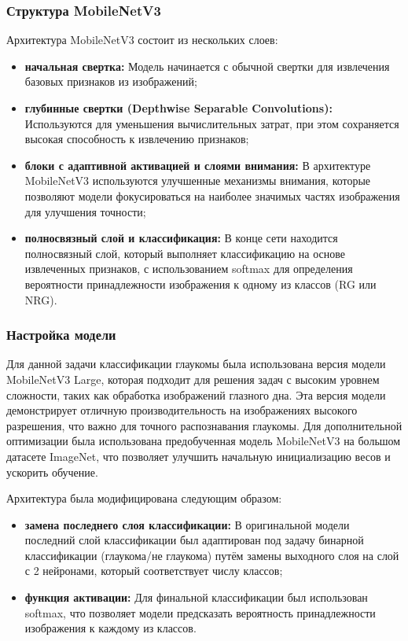 {    \subsubsection*{Структура MobileNetV3}

    Архитектура MobileNetV3 состоит из нескольких слоев:

    \begin{itemize}
        \item \textbf{начальная свертка:} Модель начинается с обычной свертки для извлечения базовых признаков из изображений;
        \item \textbf{глубинные свертки (Depthwise Separable Convolutions):} Используются для уменьшения вычислительных затрат, при этом сохраняется высокая способность к извлечению признаков;
        \item \textbf{блоки с адаптивной активацией и слоями внимания:} В архитектуре MobileNetV3 используются улучшенные механизмы внимания, которые позволяют модели фокусироваться на наиболее значимых частях изображения для улучшения точности;
        \item \textbf{полносвязный слой и классификация:} В конце сети находится полносвязный слой, который выполняет классификацию на основе извлеченных признаков, с использованием softmax для определения вероятности принадлежности изображения к одному из классов (RG или NRG).
    \end{itemize}

    \subsubsection*{Настройка модели}

    Для данной задачи классификации глаукомы была использована версия модели MobileNetV3 Large, которая подходит для решения задач с высоким уровнем сложности, таких как обработка изображений глазного дна. Эта версия модели демонстрирует отличную производительность на изображениях высокого разрешения, что важно для точного распознавания глаукомы. Для дополнительной оптимизации была использована предобученная модель MobileNetV3 на большом датасете ImageNet, что позволяет улучшить начальную инициализацию весов и ускорить обучение.

    Архитектура была модифицирована следующим образом:
    \begin{itemize}
        \item \textbf{замена последнего слоя классификации:} В оригинальной модели последний слой классификации был адаптирован под задачу бинарной классификации (глаукома/не глаукома) путём замены выходного слоя на слой с 2 нейронами, который соответствует числу классов;
        \item \textbf{функция активации:} Для финальной классификации был использован softmax, что позволяет модели предсказать вероятность принадлежности изображения к каждому из классов.
    \end{itemize}

}
